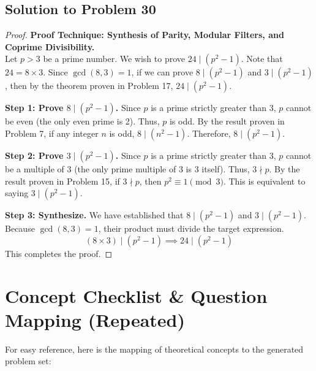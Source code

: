 \documentclass[12pt]{article}
\begin{document}
\subsection{Solution to Problem 30}
\begin{proof}
\textbf{Proof Technique: Synthesis of Parity, Modular Filters, and Coprime Divisibility.} \\
Let $p > 3$ be a prime number. We wish to prove $24 \mid (p^2 - 1)$. Note that $24 = 8 \times 3$. Since $\gcd(8, 3) = 1$, if we can prove $8 \mid (p^2 - 1)$ and $3 \mid (p^2 - 1)$, then by the theorem proven in Problem 17, $24 \mid (p^2 - 1)$.

\textbf{Step 1: Prove $8 \mid (p^2 - 1)$.}
Since $p$ is a prime strictly greater than 3, $p$ cannot be even (the only even prime is 2). Thus, $p$ is odd. By the result proven in Problem 7, if any integer $n$ is odd, $8 \mid (n^2 - 1)$. Therefore, $8 \mid (p^2 - 1)$.

\textbf{Step 2: Prove $3 \mid (p^2 - 1)$.}
Since $p$ is a prime strictly greater than 3, $p$ cannot be a multiple of 3 (the only prime multiple of 3 is 3 itself). Thus, $3 \nmid p$. By the result proven in Problem 15, if $3 \nmid p$, then $p^2 \equiv 1 \pmod 3$. This is equivalent to saying $3 \mid (p^2 - 1)$.

\textbf{Step 3: Synthesize.}
We have established that $8 \mid (p^2 - 1)$ and $3 \mid (p^2 - 1)$. Because $\gcd(8, 3) = 1$, their product must divide the target expression.
\[ (8 \times 3) \mid (p^2 - 1) \implies 24 \mid (p^2 - 1) \]
This completes the proof.
\end{proof}

\newpage

\section{Concept Checklist \& Question Mapping (Repeated)}
\label{sec:checklist_end}
For easy reference, here is the mapping of theoretical concepts to the generated problem set:
\end{document}
